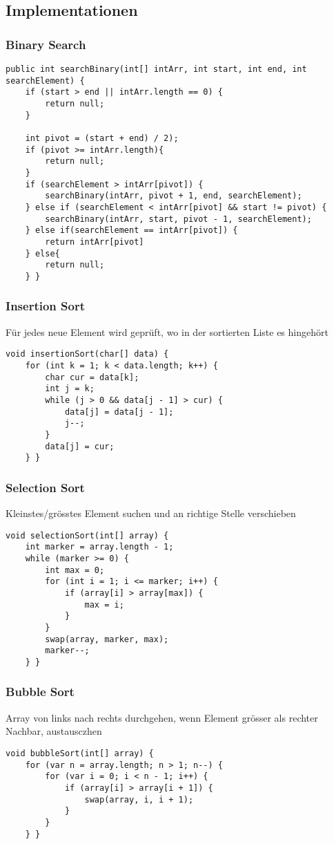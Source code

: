 \begin{multicols*}{5}
	\subsection{Implementationen}
		\subsubsection{Binary Search}
			\begin{lstlisting}
public int searchBinary(int[] intArr, int start, int end, int searchElement) {
	if (start > end || intArr.length == 0) {
		return null;
	}

	int pivot = (start + end) / 2);
	if (pivot >= intArr.length){
		return null;
	}
	if (searchElement > intArr[pivot]) {
		searchBinary(intArr, pivot + 1, end, searchElement);
	} else if (searchElement < intArr[pivot] && start != pivot) {
		searchBinary(intArr, start, pivot - 1, searchElement);
	} else if(searchElement == intArr[pivot]) {
		return intArr[pivot]
	} else{
		return null;
	} }
			\end{lstlisting}
		
		\subsubsection{Insertion Sort}
		Für jedes neue Element wird geprüft, wo in der sortierten Liste es hingehört
			\begin{lstlisting}
void insertionSort(char[] data) {
	for (int k = 1; k < data.length; k++) {
		char cur = data[k];
		int j = k;
		while (j > 0 && data[j - 1] > cur) {
			data[j] = data[j - 1];
			j--;
		}
		data[j] = cur;
	} }
			\end{lstlisting}
		
		\subsubsection{Selection Sort}
		Kleinstes/grösstes Element suchen und an richtige Stelle verschieben
		
			\begin{lstlisting}
void selectionSort(int[] array) {
	int marker = array.length - 1;
	while (marker >= 0) {
		int max = 0;
		for (int i = 1; i <= marker; i++) {
			if (array[i] > array[max]) {
				max = i;
			}
		}
		swap(array, marker, max);
		marker--;
	} }
			\end{lstlisting}
		
		\subsubsection{Bubble Sort}
		Array von links nach rechts durchgehen, wenn Element grösser als rechter Nachbar, austausczhen
			\begin{lstlisting}
void bubbleSort(int[] array) {
	for (var n = array.length; n > 1; n--) {
		for (var i = 0; i < n - 1; i++) {
			if (array[i] > array[i + 1]) {
				swap(array, i, i + 1);
			}
		}
	} }
			\end{lstlisting}
		

\end{multicols*}
